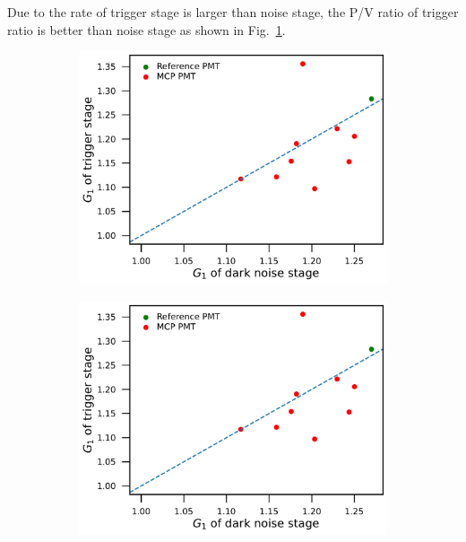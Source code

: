 Due to the rate of trigger stage is larger than noise stage, the P/V ratio of trigger ratio is better than noise stage as shown in Fig.~\ref{fig:PVCompare}.
\begin{figure}[!htbp]
    \centering
    \begin{subfigure}[b]{0.49\textwidth}
        \includegraphics[width=\textwidth,page=5]{figures/result/compare.pdf}
        \caption{}
        \label{fig:PVCompare}
    \end{subfigure}
    \begin{subfigure}[b]{0.49\textwidth}
        \includegraphics[width=\textwidth,page=6]{figures/result/compare.pdf}
        \caption{}
        \label{fig:RiseCompare}
    \end{subfigure}

\end{figure}
